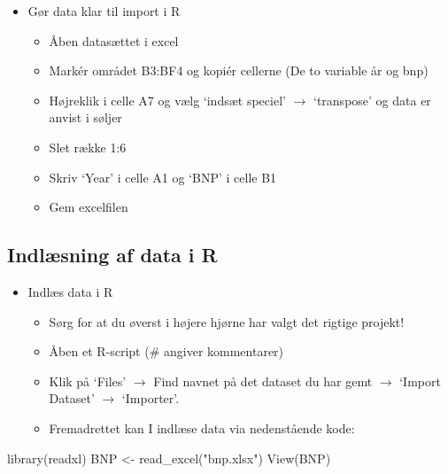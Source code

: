 \documentclass[
  12pt,
]{article}
\newenvironment{Shaded}{\begin{snugshade}}{\end{snugshade}}
\newcommand{\FunctionTok}[1]{\textcolor[rgb]{0.00,0.00,0.00}{#1}}
\newcommand{\NormalTok}[1]{#1}
\newcommand{\OtherTok}[1]{\textcolor[rgb]{0.56,0.35,0.01}{#1}}
\newcommand{\StringTok}[1]{\textcolor[rgb]{0.31,0.60,0.02}{#1}}
\providecommand{\tightlist}{%
  \setlength{\itemsep}{0pt}\setlength{\parskip}{0pt}}
\begin{document}
\begin{itemize}
\tightlist
\item
  Gør data klar til import i R

  \begin{itemize}
  \tightlist
  \item
    Åben datasættet i excel
  \item
    Markér området B3:BF4 og kopiér cellerne (De to variable år og bnp)
  \item
    Højreklik i celle A7 og vælg `indsæt speciel' \(\rightarrow\)
    `transpose' og data er anvist i søljer
  \item
    Slet række 1:6
  \item
    Skriv `Year' i celle A1 og `BNP' i celle B1
  \item
    Gem excelfilen
  \end{itemize}
\end{itemize}

\hypertarget{indluxe6sning-af-data-i-r}{%
\subsection{Indlæsning af data i R}\label{indluxe6sning-af-data-i-r}}

\begin{itemize}
\tightlist
\item
  Indlæs data i R

  \begin{itemize}
  \tightlist
  \item
    Sørg for at du øverst i højere hjørne har valgt det rigtige projekt!
  \item
    Åben et R-script (\# angiver kommentarer)
  \item
    Klik på `Files' \(\rightarrow\) Find navnet på det dataset du har
    gemt \(\rightarrow\) `Import Dataset' \(\rightarrow\) `Importer'.
  \item
    Fremadrettet kan I indlæse data via nedenstående kode:
  \end{itemize}
\end{itemize}

\begin{Shaded}
\begin{Highlighting}[]
\FunctionTok{library}\NormalTok{(readxl)}
\NormalTok{BNP }\OtherTok{\textless{}{-}} \FunctionTok{read\_excel}\NormalTok{(}\StringTok{"bnp.xlsx"}\NormalTok{)}
\FunctionTok{View}\NormalTok{(BNP) }
\end{Highlighting}
\end{Shaded}
\end{document}
